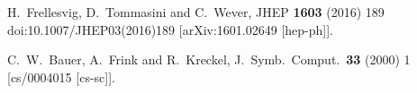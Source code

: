 \documentclass[12pt]{article}
\begin{document}
\begin{thebibliography}{99}
  H.~Frellesvig, D.~Tommasini and C.~Wever,
  JHEP {\bf 1603} (2016) 189
  doi:10.1007/JHEP03(2016)189
  [arXiv:1601.02649 [hep-ph]].
  
  C.~W.~Bauer, A.~Frink and R.~Kreckel,
  J.\ Symb.\ Comput.\  {\bf 33} (2000) 1
  [cs/0004015 [cs-sc]].

\end{thebibliography}
\end{document}
